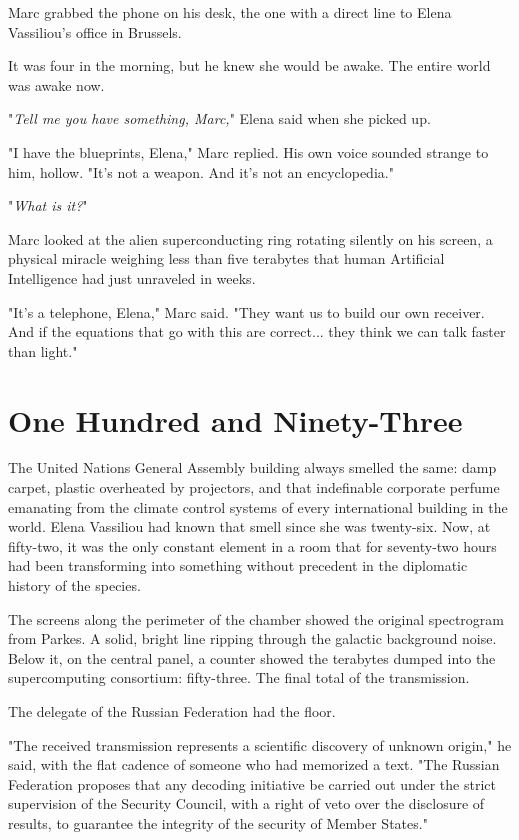 \documentclass[11pt,a5paper,twoside]{book}
\begin{document}
Marc grabbed the phone on his desk, the one with a direct line to Elena Vassiliou’s office in Brussels.

It was four in the morning, but he knew she would be awake. The entire world was awake now.

"\textit{Tell me you have something, Marc,}" Elena said when she picked up.

"I have the blueprints, Elena," Marc replied. His own voice sounded strange to him, hollow. "It's not a weapon. And it's not an encyclopedia."

"\textit{What is it?}"

Marc looked at the alien superconducting ring rotating silently on his screen, a physical miracle weighing less than five terabytes that human Artificial Intelligence had just unraveled in weeks.

"It's a telephone, Elena," Marc said. "They want us to build our own receiver. And if the equations that go with this are correct... they think we can talk faster than light."

\chapter{One Hundred and Ninety-Three}

The United Nations General Assembly building always smelled the same: damp carpet, plastic overheated by projectors, and that indefinable corporate perfume emanating from the climate control systems of every international building in the world. Elena Vassiliou had known that smell since she was twenty-six. Now, at fifty-two, it was the only constant element in a room that for seventy-two hours had been transforming into something without precedent in the diplomatic history of the species.

The screens along the perimeter of the chamber showed the original spectrogram from Parkes. A solid, bright line ripping through the galactic background noise. Below it, on the central panel, a counter showed the terabytes dumped into the supercomputing consortium: fifty-three. The final total of the transmission.

The delegate of the Russian Federation had the floor.

"The received transmission represents a scientific discovery of unknown origin," he said, with the flat cadence of someone who had memorized a text. "The Russian Federation proposes that any decoding initiative be carried out under the strict supervision of the Security Council, with a right of veto over the disclosure of results, to guarantee the integrity of the security of Member States."
\end{document}
